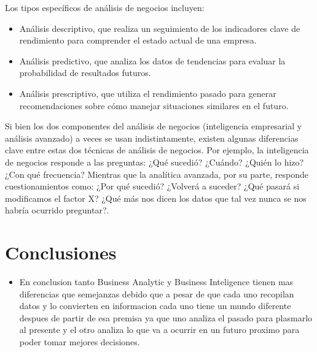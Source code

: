 \documentclass[twoside,twocolumn]{article}
\begin{document}
Los tipos específicos de análisis de negocios incluyen:
\begin{itemize}	
	\item Análisis descriptivo, que realiza un seguimiento de los indicadores clave de rendimiento para comprender el estado actual de una empresa.
	\item Análisis predictivo, que analiza los datos de tendencias para evaluar la probabilidad de resultados futuros.
	\item Análisis prescriptivo, que utiliza el rendimiento pasado para generar recomendaciones sobre cómo manejar situaciones similares en el futuro.
\end{itemize} 


Si bien los dos componentes del análisis de negocios (inteligencia empresarial y análisis avanzado) a veces se usan indistintamente, existen algunas diferencias clave entre estas dos técnicas de análisis de negocios. Por ejemplo, la inteligencia de negocios responde a las preguntas: ¿Qué sucedió? ¿Cuándo? ¿Quién lo hizo? ¿Con qué frecuencia? Mientras que la analítica avanzada, por su parte, responde cuestionamientos como: ¿Por qué sucedió? ¿Volverá a suceder? ¿Qué pasará si modificamos el factor X? ¿Qué más nos dicen los datos que tal vez nunca se nos habría ocurrido preguntar?.










\section{Conclusiones}
\begin{itemize}	
	\item En conclusion tanto Business Analytic y Business Inteligence tienen mas diferencias que semejanzas debido que a pesar de que cada uno recopilan datos y lo convierten en
informacion cada uno tiene un mundo diferente despues de partir de esa premisa ya que uno analiza el pasado para plasmarlo al presente y el otro analiza lo que va a ocurrir en un futuro proximo para poder tomar mejores decisiones.

\end{itemize} 



\end{document}
